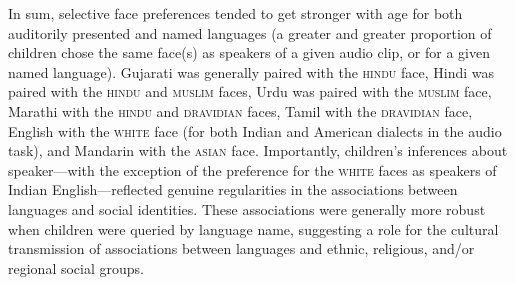 \documentclass{foushee-adapted-preprint}
\begin{document}
In sum, selective face preferences tended to get stronger with age for both auditorily presented and named languages (a greater and greater proportion of children chose the same face(s) as speakers of a given audio clip, or for a given named language). 
Gujarati was generally paired with the \textsc{hindu} face, Hindi was paired with the \textsc{hindu} and \textsc{muslim} faces,  Urdu was paired with the \textsc{muslim} face,  Marathi with the \textsc{hindu} and \textsc{dravidian} faces, Tamil with the \textsc{dravidian} face, English  with the \textsc{white} face (for both Indian and American dialects in the audio task), and Mandarin with the \textsc{asian} face. 
Importantly, children's inferences about speaker---with the exception of the preference for the \textsc{white} faces as speakers of Indian English---reflected genuine regularities in the associations between languages and social identities. 
These associations were generally more robust when children were queried by language name, suggesting a role for the cultural transmission of associations between languages and ethnic, religious, and/or regional social groups. %
%
\end{document}
